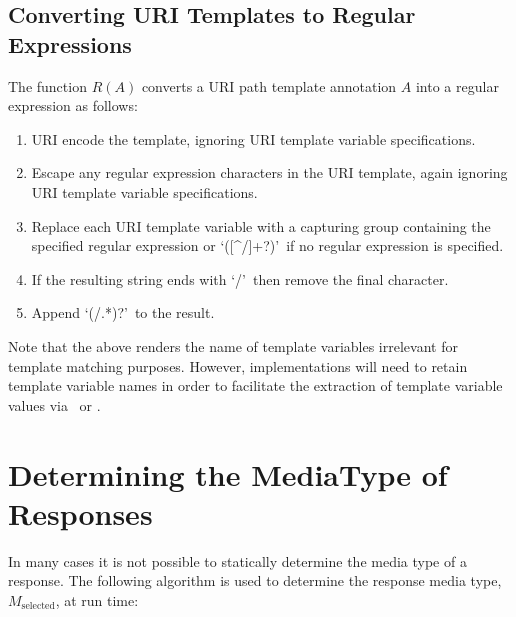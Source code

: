 \subsection{Converting URI Templates to Regular Expressions}
\label{template_to_regex}

The function $R(A)$ converts a URI path template annotation $A$ into a regular expression as follows:
\begin{enumerate}
\item URI encode the template, ignoring URI template variable specifications.
\item Escape any regular expression characters in the URI template, again ignoring URI template variable specifications.
\item Replace each URI template variable with a capturing group containing the specified regular expression or \lq([\^{ }/]+?)\rq\ if no regular expression is specified.
\item If the resulting string ends with \lq/\rq\ then remove the final character.
\item Append \lq(/.*)?\rq\ to the result.
\end{enumerate}

Note that the above renders the name of template variables irrelevant for template matching purposes. However, implementations will need to retain template variable names in order to facilitate the extraction of template variable values via \PathParam\ or \UriInfo{}.

\section{Determining the MediaType of Responses}
\label{determine_response_type}

In many cases it is not possible to statically determine the media type of a response. The following algorithm is used to determine the response media type, $M_{\mbox{selected}}$, at run time:

